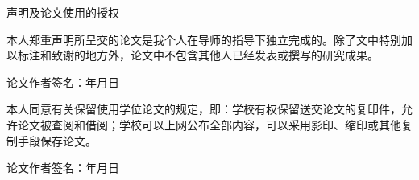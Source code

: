 

\pagestyle{originality}


\setlength{\parskip}{0.4em}
\renewcommand{\baselinestretch}{1.41}

\vspace*{-6mm}

\begin{center}
  \heiti{}\textmd{声明及论文使用的授权}
\end{center}

\vspace{10mm}



本人郑重声明所呈交的论文是我个人在导师的指导下独立完成的。除了文中特别加以标注和致谢的地方外，论文中不包含其他人已经发表或撰写的研究成果。

\vspace{15mm}

\begin{flushright}
  论文作者签名：\hspace{75mm}年\hspace{8mm}月\hspace{8mm}日
\end{flushright}

\vspace{40mm}



本人同意\schoolName 有关保留使用学位论文的规定，即：学校有权保留送交论文的复印件，允许论文被查阅和借阅；学校可以上网公布全部内容，可以采用影印、缩印或其他复制手段保存论文。

\vspace*{15mm}

\begin{flushright}
  论文作者签名：\hspace{75mm}年\hspace{8mm}月\hspace{8mm}日
\end{flushright}

\newpage
